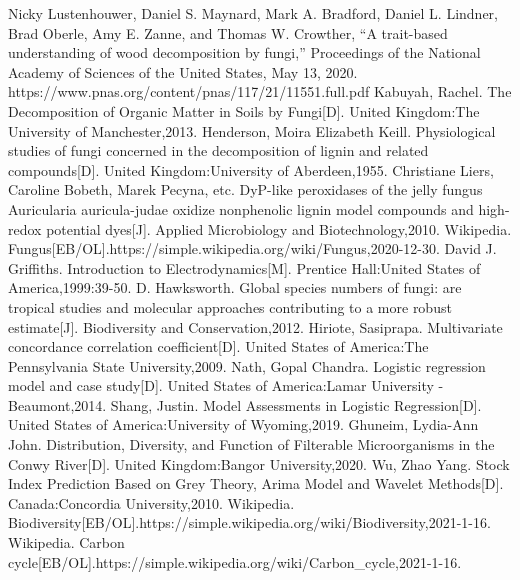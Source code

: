 \begin{thebibliography}{99}
  Nicky Lustenhouwer, Daniel S. Maynard, Mark A. Bradford, Daniel L. Lindner, Brad Oberle, Amy E. Zanne, and Thomas W. Crowther, “A trait-based understanding of wood decomposition by fungi,” Proceedings of the National Academy of Sciences of the United States, May 13, 2020. https://www.pnas.org/content/pnas/117/21/11551.full.pdf
  Kabuyah, Rachel. The Decomposition of Organic Matter in Soils by Fungi[D]. United Kingdom:The University of Manchester,2013.
  Henderson, Moira Elizabeth Keill. Physiological studies of fungi concerned in the decomposition of lignin and related compounds[D]. United Kingdom:University of Aberdeen,1955.
  Christiane Liers, Caroline Bobeth, Marek Pecyna, etc. DyP-like peroxidases of the jelly fungus Auricularia auricula-judae oxidize nonphenolic lignin model compounds and high-redox potential dyes[J]. Applied Microbiology and Biotechnology,2010.
  Wikipedia. Fungus[EB/OL].https://simple.wikipedia.org/wiki/Fungus,2020-12-30.
  David J. Griffiths. Introduction to Electrodynamics[M]. Prentice Hall:United States of America,1999:39-50.
  D. Hawksworth. Global species numbers of fungi: are tropical studies and molecular approaches contributing to a more robust estimate[J]. Biodiversity and Conservation,2012.
  Hiriote, Sasiprapa. Multivariate concordance correlation coefficient[D]. United States of America:The Pennsylvania State University,2009.
  Nath, Gopal Chandra. Logistic regression model and case study[D]. United States of America:Lamar University - Beaumont,2014.
  Shang, Justin. Model Assessments in Logistic Regression[D]. United States of America:University of Wyoming,2019.
  Ghuneim, Lydia-Ann John. Distribution, Diversity, and Function of Filterable Microorganisms in the Conwy River[D]. United Kingdom:Bangor University,2020.
  Wu, Zhao Yang. Stock Index Prediction Based on Grey Theory, Arima Model and Wavelet Methods[D]. Canada:Concordia University,2010.
  Wikipedia. Biodiversity[EB/OL].https://simple.wikipedia.org/wiki/Biodiversity,2021-1-16.
  Wikipedia. Carbon cycle[EB/OL].https://simple.wikipedia.org/wiki/Carbon\_cycle,2021-1-16.
\end{thebibliography}